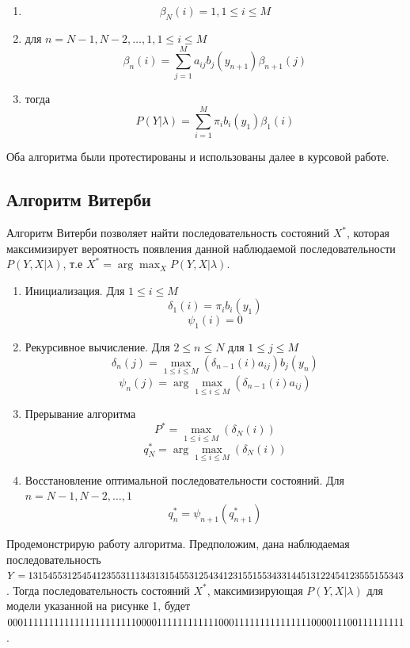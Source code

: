 \documentclass[]{article}
\begin{document}
				\begin{enumerate}
					\item \[
					\beta_{N}(i) = 1,1 \leq i \leq M
					\]
					\item для $n = N-1, N-2,\dots,1, 1 \leq i \leq M$
					\[
					\beta_{n}(i) = \sum_{j=1}^{M}{a_{ij}b_{j}(y_{n+1})
					\beta_{n+1}(j)}
					\]
					\item тогда
					\[
					P(Y|\lambda) = \sum_{i=1}^{M}{\pi_{i}b_{i}(y_{1})\beta_{1}(i)}
					\]
				\end{enumerate}
	
		Оба алгоритма были протестированы и использованы далее в курсовой работе.
	
	\subsection{Алгоритм Витерби}
		Алгоритм Витерби позволяет найти последовательность состояний $X^{*}$, которая максимизирует вероятность появления данной наблюдаемой последовательности $P(Y,X|\lambda)$, т.е $X^{*} = \arg \max_{X} P(Y,X|\lambda)$.
		\begin{enumerate}
			\item Инициализация. Для $1 \leq i \leq M$
			\[
				\delta_{1}(i) = \pi_{i}b_{i}(y_{1})
			\]
			\[
				\psi_{1}(i) = 0
			\]
			\item Рекурсивное вычисление. Для $2 \leq n \leq N$ для $1 \leq j \leq M$
			\[
				\delta_{n}(j) = \max_{1 \leq i \leq M}(\delta_{n-1}(i)a_{ij})b_{j}(y_{n})
			\]
			\[
				\psi_{n}(j) = \arg \max_{1 \leq i \leq M} (\delta_{n-1}(i)a_{ij})
			\]
			\item Прерывание алгоритма
			\[
				P^{*} = \max_{1 \leq i \leq M} (\delta_{N}(i))
			\]
			\[
				q^{*}_{N} = \arg \max_{1 \leq i \leq M} (\delta_{N}(i))
			\]
			\item Восстановление оптимальной последовательности состояний. Для $n = N-1, N-2, \dots, 1$
			\[
				q^{*}_{n} = \psi_{n+1}(q^{*}_{n+1})
			\]
		\end{enumerate}
	
	Продемонстрирую работу алгоритма. Предположим, дана наблюдаемая последовательность $Y = 1315455312545412355311134313154553125434123 15515\\53433144513122454123555155343$. Тогда последовательность состояний $X^{*}$, максимизирующая $P(Y,X|\lambda)$ для модели указанной на рисунке 1, будет $0001111111\\1111111111111110000111111111111000111111111111111000011100111111111$.
	
\end{document}
